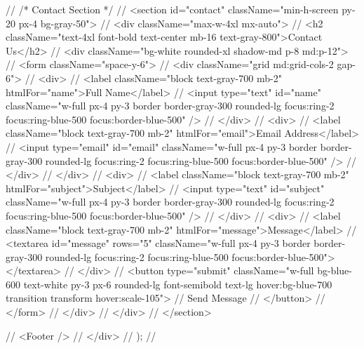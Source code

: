 {//       {/* Contact Section */}
//       <section id="contact" className="min-h-screen py-20 px-4 bg-gray-50">
//         <div className="max-w-4xl mx-auto">
//           <h2 className="text-4xl font-bold text-center mb-16 text-gray-800">Contact Us</h2>
//           <div className="bg-white rounded-xl shadow-md p-8 md:p-12">
//             <form className="space-y-6">
//               <div className="grid md:grid-cols-2 gap-6">
//                 <div>
//                   <label className="block text-gray-700 mb-2" htmlFor="name">Full Name</label>
//                   <input type="text" id="name" className="w-full px-4 py-3 border border-gray-300 rounded-lg focus:ring-2 focus:ring-blue-500 focus:border-blue-500" />
//                 </div>
//                 <div>
//                   <label className="block text-gray-700 mb-2" htmlFor="email">Email Address</label>
//                   <input type="email" id="email" className="w-full px-4 py-3 border border-gray-300 rounded-lg focus:ring-2 focus:ring-blue-500 focus:border-blue-500" />
//                 </div>
//               </div>
//               <div>
//                 <label className="block text-gray-700 mb-2" htmlFor="subject">Subject</label>
//                 <input type="text" id="subject" className="w-full px-4 py-3 border border-gray-300 rounded-lg focus:ring-2 focus:ring-blue-500 focus:border-blue-500" />
//               </div>
//               <div>
//                 <label className="block text-gray-700 mb-2" htmlFor="message">Message</label>
//                 <textarea id="message" rows="5" className="w-full px-4 py-3 border border-gray-300 rounded-lg focus:ring-2 focus:ring-blue-500 focus:border-blue-500"></textarea>
//               </div>
//               <button type="submit" className="w-full bg-blue-600 text-white py-3 px-6 rounded-lg font-semibold text-lg hover:bg-blue-700 transition transform hover:scale-105">
//                 Send Message
//               </button>
//             </form>
//           </div>
//         </div>
//       </section>

//       <Footer />
//     </div>
//   );
// }

